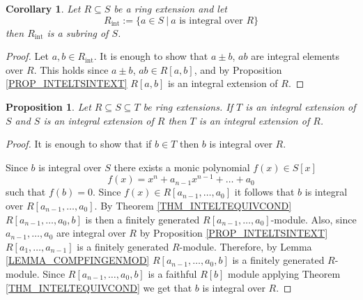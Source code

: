 \documentclass[12pt, letterpaper, oneside]{article}
\theoremstyle{plain}
\newtheorem{proposition}[theorem]{Proposition}
\newtheorem{corollary}[theorem]{Corollary}
\theoremstyle{definition}
\newcommand{\vs}{\vskip 5mm}
\begin{document}
\begin{corollary}
Let $R\subseteq S$ be a ring extension and let 
$$R_{\text{int}} := \{ a\in S \ | \  a \text{ is integral over } R\}$$
then $R_{\text{int}}$ is a subring of $S$. 
\end{corollary}

\vs

\begin{proof}
Let $a, b\in R_{\text{int}}$. It is enough to show that $a\pm b$, $ab$ are integral elements
over $R$. This holds since $a\pm b$, $ab\in R[a, b]$, and by Proposition  \ref{PROP_INTELTSINTEXT}
$R[a, b]$ is an integral extension of $R$. 
\end{proof}

\vs\vs

\begin{proposition}
\label{PROP_COMPINTISINT}
Let $R\subseteq S \subseteq T$ be ring extensions. If $T$ is an integral extension of $S$ and 
$S$ is an integral extension of $R$ then $T$ is an integral extension of $R$. 
\end{proposition}

\vs

\begin{proof}
It is enough to show that if $b\in T$ then $b$ is integral over $R$. 

Since $b$ is integral over $S$ there exists a monic polynomial $f(x)\in S[x]$
$$f(x) = x^{n} +a_{n-1}x^{n-1} + {\dots} + a_{0}$$
such that $f(b) = 0$. Since $f(x)\in R[a_{n-1}, \dots, a_{0}]$ it follows that $b$ is integral
over $R[a_{n-1}, \dots, a_{0}]$. By Theorem \ref{THM_INTELTEQUIVCOND} 
$R[a_{n-1}, \dots, a_{0}, b]$ is then a finitely generated $R[a_{n-1}, \dots, a_{0}]$-module. 
Also,  since $a_{n-1}, \dots, a_{0}$ are integral over $R$ by Proposition 
\ref{PROP_INTELTSINTEXT} $R[a_{1}, \dots, a_{n-1}]$ is a finitely generated $R$-module. 
Therefore, by Lemma \ref{LEMMA_COMPFINGENMOD} $R[a_{n-1}, \dots, a_{0}, b]$ is 
a finitely generated $R$-module. Since $R[a_{n-1}, \dots, a_{0}, b]$ is a faithful $R[b]$ module 
applying Theorem \ref{THM_INTELTEQUIVCOND}  we get that $b$ is integral over $R$. 

\end{proof}





\end{document}

